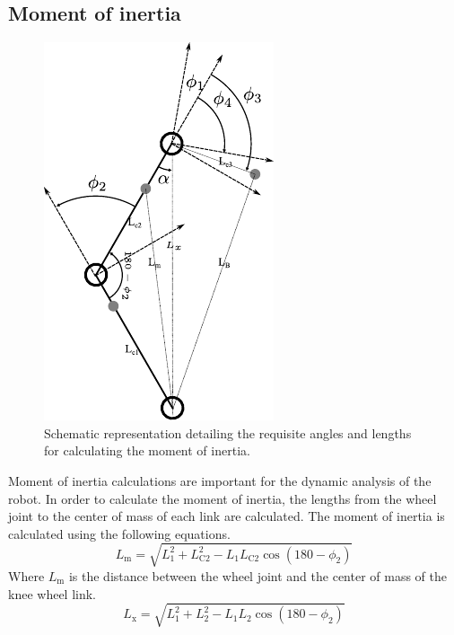 \subsection{Moment of inertia}
    \begin{figure}[h]
        \centering
        \includegraphics[width=.5\textwidth]{Angles}
        \caption[Moment of inertia Schematic representation]{Schematic representation detailing the requisite angles and lengths for calculating the moment of inertia.}
        \label{fig:Schematic representation xxxxx detailing the requisite angles and lengths for calculating the moment of inertia.}
    \end{figure}

    Moment of inertia calculations are important for the dynamic analysis of the robot. In order to calculate the moment of inertia, the lengths from the wheel joint to the center of mass of each link are calculated. The moment of inertia is calculated using the following equations.
    \begin{equation}
        L_{\mathrm{m}} = \sqrt{L_{\mathrm{1}}^2 + L_{\mathrm{C2}}^2 - L_{\mathrm{1}} L_{\mathrm{C2}} \cos(180 - \phi_{\mathrm{2}})}
    \end{equation}
    Where $L_{\mathrm{m}}$ is the distance between the wheel joint and the center of mass of the knee wheel link.
    \begin{equation}
        L_{\mathrm{x}} = \sqrt{L_{\mathrm{1}}^2 + L_{\mathrm{2}}^2 - L_{\mathrm{1}} L_{\mathrm{2}} \cos(180 - \phi_{\mathrm{2}})}
    \end{equation}

